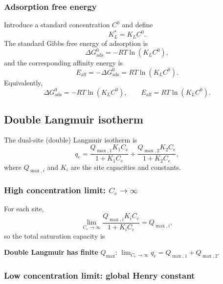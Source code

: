 \documentclass[journal=jacsat,manuscript=article]{achemso}
\begin{document}
\subsubsection{Adsorption free energy}

Introduce a standard concentration \(C^0\) and define
\begin{equation}
	K_L^{\ast} = K_L C^0.
\end{equation}
The standard Gibbs free energy of adsorption is
\begin{equation}
	\Delta G_{\mathrm{ads}}^{0}
	= - R T \ln\left( K_L C^0 \right),
\end{equation}
and the corresponding affinity energy is
\begin{equation}
	E_{\mathrm{aff}} = - \Delta G_{\mathrm{ads}}^{0}
	= R T \ln\left( K_L C^0 \right).
\end{equation}
Equivalently,
\begin{equation}
	\boxed {
		\Delta G_{\mathrm{ads}}^{0}
		= - R T \ln\left( K_L C^0 \right),
		\qquad
		E_{\mathrm{aff}} = R T \ln\left( K_L C^0 \right).
	}
\end{equation}

\subsection{Double Langmuir isotherm}
\label{sec:si_double_langmuir}

The dual-site (double) Langmuir isotherm is
\begin{equation}
	q_e
	= \frac{Q_{\max,1} K_1 C_e}{1 + K_1 C_e}
	+ \frac{Q_{\max,2} K_2 C_e}{1 + K_2 C_e},
	\label{eq:si_double_langmuir}
\end{equation}
where \(Q_{\max,i}\) and \(K_i\) are the site capacities and constants.

\subsubsection{High concentration limit: \(C_e \to \infty\)}

For each site,
\begin{equation}
	\lim_{C_e \to \infty} \frac{Q_{\max,i} K_i C_e}{1 + K_i C_e}
	= Q_{\max,i},
\end{equation}
so the total saturation capacity is

\textbf{Double Langmuir has finite }$Q_{\max}$:\quad
$\displaystyle \lim_{C_e \to \infty} q_e = Q_{\max,1} + Q_{\max,2}$.

\subsubsection{Low concentration limit: global Henry constant}
\end{document}
